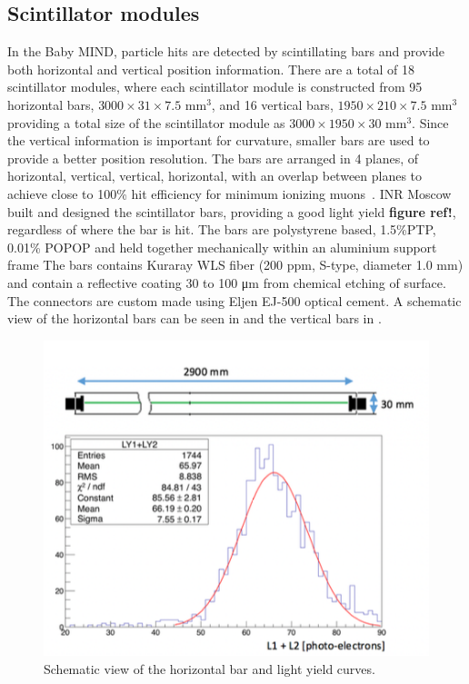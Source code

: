 \subsection{Scintillator modules}
In the Baby MIND, particle hits are detected by scintillating bars and provide both horizontal and vertical position information. There are a total of 18 scintillator modules, where each scintillator module is constructed from 95 horizontal bars, $3000 \times 31 \times 7.5$ mm$^3$, and 16 vertical bars, $1950 \times 210 \times 7.5$ mm$^3$ providing a total size of the scintillator module as $3000 \times 1950 \times 30$ mm$^3$. Since the vertical information is important for curvature, smaller bars are used to provide a better position resolution. The bars are arranged in 4 planes, of horizontal, vertical, vertical, horizontal, with an overlap between planes to achieve close to 100\% hit efficiency for minimum ionizing muons~\cite{51Saba}. INR Moscow built and designed the scintillator bars, providing a good light yield \textbf{figure ref!}, regardless of where the bar is hit. The bars are polystyrene based, 1.5\%PTP, 0.01\% POPOP and held together mechanically within an aluminium support frame  The bars contains Kuraray WLS fiber (200 ppm, S-type, diameter 1.0 mm) and contain a reflective coating 30 to 100 μm from chemical etching of surface. The connectors are custom made using Eljen EJ-500 optical cement. A schematic view of the horizontal bars can be seen in  and the vertical bars in . 



\begin{figure}[h!]
\centering
\includegraphics[width=\textwidth]{figures/horizontal.png}
\caption{Schematic view of the horizontal bar and light yield curves.}
\label{fig:horizontal}
\end{figure}


